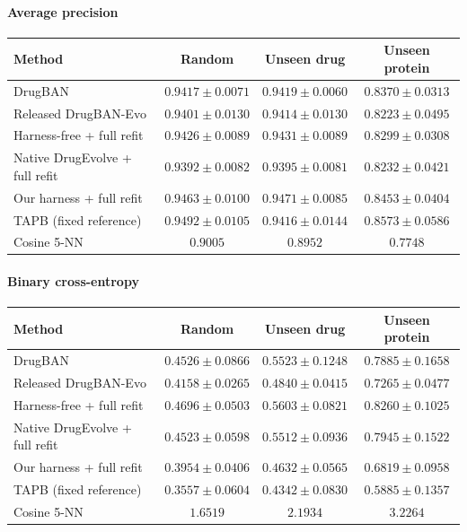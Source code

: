 \paragraph{Average precision}
\begin{tabular}{lccc}
\toprule
Method & Random & Unseen drug & Unseen protein \\
\midrule
DrugBAN & $0.9417 \pm 0.0071$ & $0.9419 \pm 0.0060$ & $0.8370 \pm 0.0313$ \\
Released DrugBAN-Evo & $0.9401 \pm 0.0130$ & $0.9414 \pm 0.0130$ & $0.8223 \pm 0.0495$ \\
Harness-free + full refit & $0.9426 \pm 0.0089$ & $0.9431 \pm 0.0089$ & $0.8299 \pm 0.0308$ \\
Native DrugEvolve + full refit & $0.9392 \pm 0.0082$ & $0.9395 \pm 0.0081$ & $0.8232 \pm 0.0421$ \\
Our harness + full refit & $0.9463 \pm 0.0100$ & $0.9471 \pm 0.0085$ & $0.8453 \pm 0.0404$ \\
TAPB (fixed reference) & $0.9492 \pm 0.0105$ & $0.9416 \pm 0.0144$ & $0.8573 \pm 0.0586$ \\
Cosine 5-NN & $0.9005$ & $0.8952$ & $0.7748$ \\
\bottomrule
\end{tabular}

\paragraph{Binary cross-entropy}
\begin{tabular}{lccc}
\toprule
Method & Random & Unseen drug & Unseen protein \\
\midrule
DrugBAN & $0.4526 \pm 0.0866$ & $0.5523 \pm 0.1248$ & $0.7885 \pm 0.1658$ \\
Released DrugBAN-Evo & $0.4158 \pm 0.0265$ & $0.4840 \pm 0.0415$ & $0.7265 \pm 0.0477$ \\
Harness-free + full refit & $0.4696 \pm 0.0503$ & $0.5603 \pm 0.0821$ & $0.8260 \pm 0.1025$ \\
Native DrugEvolve + full refit & $0.4523 \pm 0.0598$ & $0.5512 \pm 0.0936$ & $0.7945 \pm 0.1522$ \\
Our harness + full refit & $0.3954 \pm 0.0406$ & $0.4632 \pm 0.0565$ & $0.6819 \pm 0.0958$ \\
TAPB (fixed reference) & $0.3557 \pm 0.0604$ & $0.4342 \pm 0.0830$ & $0.5885 \pm 0.1357$ \\
Cosine 5-NN & $1.6519$ & $2.1934$ & $3.2264$ \\
\bottomrule
\end{tabular}

